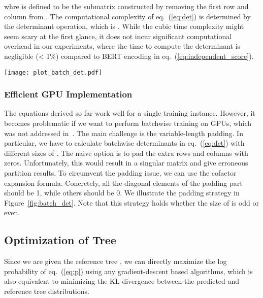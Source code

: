 \documentclass[11pt]{article}
\begin{document}
whre  is defined to be the submatrix constructed by removing the first row and column from .
The computational complexity of eq.~(\ref{eq:det}) is determined by the determinant operation, which is .
While the cubic time complexity might seem scary at the first glance, it does not incur significant computational overhead in our experiments, where the time to compute the determinant is negligible (< 1\%) compared to BERT encoding in eq.~(\ref{eq:independent_score}).

\begin{figure*}[]
\hspace*{-10mm} \texttt{[image: plot\_batch\_det.pdf]}
\caption{This is an efficient padding for calculating batch determinant. The original  matrix is expanded to a  (leftmost) one for padding. Note that the last two diagonal elements are all ones. The second matrix encodes the coefficients for multiplying sub-matrices. After a series of cofactor expansions, we can see that the determinant of the padded  matrix is equivalent to the original unpadded  matrix.}
\label{fig:batch_det}
\vspace{-3mm}
\end{figure*}



\subsubsection{Efficient GPU Implementation}
The equations derived so far work well for a single training instance. However, it becomes problematic if we want to perform batchwise training on GPUs, which was not addressed in~\citet{koo2007structured}.
The main challenge is the variable-length padding. In particular, we have to calculate batchwise determinants in eq.~(\ref{eq:det}) with different sizes of . The naive option is to pad the extra rows and columns with zeros. Unfortunately, this would result in a singular matrix and give erroneous partition results. To circumvent the padding issue, we can use the cofactor expansion formula. Concretely, all the diagonal elements of the padding part should be 1, while others should be 0. We illustrate the padding strategy in Figure~\ref{fig:batch_det}. Note that this strategy holds whether the size of  is odd or even.

\subsection{Optimization of Tree}
Since we are given the reference tree , we can directly maximize the log probability of eq.~(\ref{eq:p}) using any gradient-descent based algorithms, which is also equivalent to minimizing the KL-divergence between the predicted and reference tree distributions.
\end{document}

